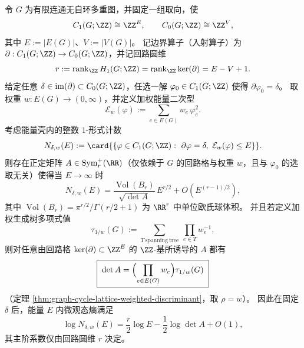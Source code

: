 
\begin{theorem}\label{thm:graph-energy-shell-lattice-counting}
令 \(G\) 为有限连通无自环多重图，并固定一组取向，使
\[
C_1(G;\ZZ)\cong \ZZ^{E},
\qquad
C_0(G;\ZZ)\cong \ZZ^{V},
\]
其中 \(E:=|E(G)|\)、\(V:=|V(G)|\)。
记边界算子（入射算子）为 \(\partial:C_1(G;\ZZ)\to C_0(G;\ZZ)\)，并记回路圆维
\[
r:=\operatorname{rank}_{\ZZ}H_1(G;\ZZ)=\operatorname{rank}_{\ZZ}\ker(\partial)=E-V+1.
\]
给定任意 \(\delta\in \mathrm{im}(\partial)\subset C_0(G;\ZZ)\)，任选一解 \(\varphi_0\in C_1(G;\ZZ)\) 使得 \(\partial\varphi_0=\delta\)。
取权重 \(w:E(G)\to(0,\infty)\)，并定义加权能量二次型
\[
\mathcal E_w(\varphi):=\sum_{e\in E(G)} w_e\,\varphi_e^2.
\]
考虑能量壳内的整数 \(1\)-形式计数
\[
N_{\delta,w}(E):=\card{\left\{\varphi\in C_1(G;\ZZ):\ \partial\varphi=\delta,\ \mathcal E_w(\varphi)\le E\right\}}.
\]
则存在正定矩阵 \(A\in\mathrm{Sym}_r^+(\RR)\)（仅依赖于 \(G\) 的回路格与权重 \(w\)，且与 \(\varphi_0\) 的选取无关）使得当 \(E\to\infty\) 时
\[
N_{\delta,w}(E)=\frac{\operatorname{Vol}(B_r)}{\sqrt{\det A}}\,E^{r/2}+O\!\left(E^{(r-1)/2}\right),
\]
其中 \(\operatorname{Vol}(B_r)=\pi^{r/2}/\Gamma(r/2+1)\) 为 \(\RR^r\) 中单位欧氏球体积。
并且若定义加权生成树多项式值
\[
\tau_{1/w}(G):=\sum_{T\ \mathrm{spanning\ tree}}\ \prod_{e\in T}w_e^{-1},
\]
则对任意由回路格 \(\ker(\partial)\subset \ZZ^{E}\) 的 \(\ZZ\)-基所诱导的 \(A\) 都有
\[
\boxed{\;\det A=\Bigl(\prod_{e\in E(G)}w_e\Bigr)\tau_{1/w}(G)\;}
\]
（定理 \ref{thm:graph-cycle-lattice-weighted-discriminant}，取 \(\rho=w\)）。
因此在固定 \(\delta\) 后，能量 \(E\) 内微观态熵满足
\[
\log N_{\delta,w}(E)=\frac r2\log E-\frac12\log\det A+O(1),
\]
其主阶系数仅由回路圆维 \(r\) 决定。
\end{theorem}
